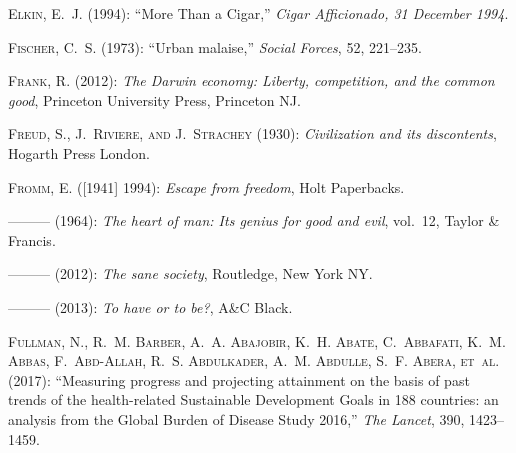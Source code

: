 \documentclass[10pt, letterpaper]{article}
\begin{document}
\begin{spacing}{2}
\begin{thebibliography}{120}
\textsc{Elkin, E.~J.} (1994): \enquote{More Than a Cigar,} \emph{Cigar
  Afficionado, 31 December 1994}.

\textsc{Fischer, C.~S.} (1973): \enquote{Urban malaise,} \emph{Social Forces},
  52, 221--235.

\textsc{Frank, R.} (2012): \emph{The Darwin economy: Liberty, competition, and
  the common good}, Princeton University Press, Princeton NJ.

\textsc{Freud, S., J.~Riviere, and J.~Strachey} (1930): \emph{Civilization and
  its discontents}, Hogarth Press London.

\textsc{Fromm, E.} ([1941] 1994): \emph{Escape from freedom}, Holt Paperbacks.

---\hspace{-.1pt}---\hspace{-.1pt}--- (1964): \emph{The heart of man: Its
  genius for good and evil}, vol.~12, Taylor \& Francis.

---\hspace{-.1pt}---\hspace{-.1pt}--- (2012): \emph{The sane society},
  Routledge, New York NY.

---\hspace{-.1pt}---\hspace{-.1pt}--- (2013): \emph{To have or to be?}, A\&C
  Black.

\textsc{Fullman, N., R.~M. Barber, A.~A. Abajobir, K.~H. Abate, C.~Abbafati,
  K.~M. Abbas, F.~Abd-Allah, R.~S. Abdulkader, A.~M. Abdulle, S.~F. Abera,
  et~al.} (2017): \enquote{Measuring progress and projecting attainment on the
  basis of past trends of the health-related Sustainable Development Goals in
  188 countries: an analysis from the Global Burden of Disease Study 2016,}
  \emph{The Lancet}, 390, 1423--1459.


\end{thebibliography}
\end{spacing}
\end{document}
